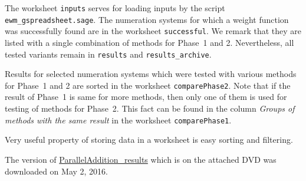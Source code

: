 The worksheet \verb+inputs+ serves for loading inputs by the script \verb+ewm_gspreadsheet.sage+. The numeration systems for which a weight function was successfully found are in the worksheet \verb+successful+. We remark that they are listed with a single combination of methods for Phase~1 and 2. Nevertheless, all tested variants remain in \verb+results+ and \verb+results_archive+. 

Results for selected numeration systems which were tested with various  methods for Phase~1 and 2 are sorted in the worksheet \verb+comparePhase2+. Note that if the result of Phase~1 is same for more methods, then only one of them is used for testing of methods for Phase~2. This fact can be found in the column \emph{Groups of methods with the same result} in the worksheet \verb+comparePhase1+.

Very useful property of storing data in a worksheet is easy sorting and filtering.

The version of \href{https://docs.google.com/spreadsheets/d/1TnhrHdefHfHa0WSeVs4q6XVj3epjPlPlnoekE0E1xeM/edit?usp=sharing}{ParallelAddition\_results} which is on the attached DVD was downloaded on May 2, 2016.
